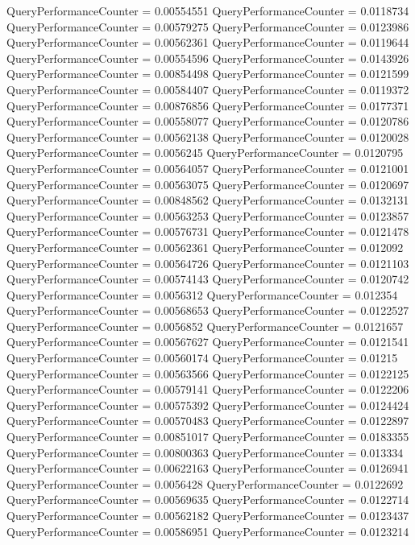 \documentclass[9pt]{article}
\theoremstyle{plain}
\theoremstyle{definition}
\theoremstyle{remark}
\numberwithin{equation}{section}
\begin{document}
QueryPerformanceCounter  =  0.00554551
QueryPerformanceCounter  =  0.0118734
QueryPerformanceCounter  =  0.00579275
QueryPerformanceCounter  =  0.0123986
QueryPerformanceCounter  =  0.00562361
QueryPerformanceCounter  =  0.0119644
QueryPerformanceCounter  =  0.00554596
QueryPerformanceCounter  =  0.0143926
QueryPerformanceCounter  =  0.00854498
QueryPerformanceCounter  =  0.0121599
QueryPerformanceCounter  =  0.00584407
QueryPerformanceCounter  =  0.0119372
QueryPerformanceCounter  =  0.00876856
QueryPerformanceCounter  =  0.0177371
QueryPerformanceCounter  =  0.00558077
QueryPerformanceCounter  =  0.0120786
QueryPerformanceCounter  =  0.00562138
QueryPerformanceCounter  =  0.0120028
QueryPerformanceCounter  =  0.0056245
QueryPerformanceCounter  =  0.0120795
QueryPerformanceCounter  =  0.00564057
QueryPerformanceCounter  =  0.0121001
QueryPerformanceCounter  =  0.00563075
QueryPerformanceCounter  =  0.0120697
QueryPerformanceCounter  =  0.00848562
QueryPerformanceCounter  =  0.0132131
QueryPerformanceCounter  =  0.00563253
QueryPerformanceCounter  =  0.0123857
QueryPerformanceCounter  =  0.00576731
QueryPerformanceCounter  =  0.0121478
QueryPerformanceCounter  =  0.00562361
QueryPerformanceCounter  =  0.012092
QueryPerformanceCounter  =  0.00564726
QueryPerformanceCounter  =  0.0121103
QueryPerformanceCounter  =  0.00574143
QueryPerformanceCounter  =  0.0120742
QueryPerformanceCounter  =  0.0056312
QueryPerformanceCounter  =  0.012354
QueryPerformanceCounter  =  0.00568653
QueryPerformanceCounter  =  0.0122527
QueryPerformanceCounter  =  0.0056852
QueryPerformanceCounter  =  0.0121657
QueryPerformanceCounter  =  0.00567627
QueryPerformanceCounter  =  0.0121541
QueryPerformanceCounter  =  0.00560174
QueryPerformanceCounter  =  0.01215
QueryPerformanceCounter  =  0.00563566
QueryPerformanceCounter  =  0.0122125
QueryPerformanceCounter  =  0.00579141
QueryPerformanceCounter  =  0.0122206
QueryPerformanceCounter  =  0.00575392
QueryPerformanceCounter  =  0.0124424
QueryPerformanceCounter  =  0.00570483
QueryPerformanceCounter  =  0.0122897
QueryPerformanceCounter  =  0.00851017
QueryPerformanceCounter  =  0.0183355
QueryPerformanceCounter  =  0.00800363
QueryPerformanceCounter  =  0.013334
QueryPerformanceCounter  =  0.00622163
QueryPerformanceCounter  =  0.0126941
QueryPerformanceCounter  =  0.0056428
QueryPerformanceCounter  =  0.0122692
QueryPerformanceCounter  =  0.00569635
QueryPerformanceCounter  =  0.0122714
QueryPerformanceCounter  =  0.00562182
QueryPerformanceCounter  =  0.0123437
QueryPerformanceCounter  =  0.00586951
QueryPerformanceCounter  =  0.0123214
\end{document}
